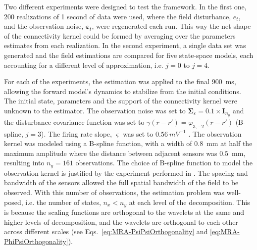 \documentclass[review,authoryear,3p]{elsarticle}
\begin{document}
Two different experiments were designed to test the framework. In the first one, 200 realizations of 1 second of data were used, where the field disturbance, $e_t$, and the observation noise, $\boldsymbol\varepsilon_t$, were regenerated each run. This way the net shape of the connectivity kernel could be formed by averaging over the parameters estimates from each realization. In the second experiment, a single data set was generated and the field estimations are compared for five state-space models, each accounting for a different level of approximation, i.e. $j=0$ to $j=4$. 

For each of the experiments, the estimation was applied to the final 900~ms, allowing the forward model's dynamics to stabilize from the initial conditions. The initial state, parameters and the support of the connectivity kernel were unknown to the estimator. The observation noise was set to $\boldsymbol\Sigma_{\varepsilon}=0.1 \times \mathbf{I}_{n_y}$ and the disturbance covariance function was set to $\gamma(r-r') = \varphi_{3,-2}(r-r')$ (B-spline, $j=3$).  The firing rate slope, $\varsigma$ was set to $0.56~mV^{-1}$ \citep{Wendling2005}. The observation kernel was modeled using a B-spline function, with a width of 0.8~mm at half the maximum amplitude where the distance between adjacent sensors was $0.5$~mm, resulting into $n_y = 161$ observations. The choice of B-spline function to model the observation kernel is justified by the experiment performed in \citep{Freestone2011}. The spacing and bandwidth of the sensors allowed the full spatial bandwidth of the field to be observed.  With this number of observations, the estimation problem was well-posed, i.e. the number of states, $n_x < n_y$ at each level of the decomposition. This is because the scaling functions are orthogonal to the wavelets at the same and higher levels of decomposition, and  the wavelets are orthogonal to each other across different scales (see Eqs.~\eqref{eq:MRA-PsiPsiOrthogonality} and \eqref{eq:MRA-PhiPsiOrthogonality}). 
\end{document}
